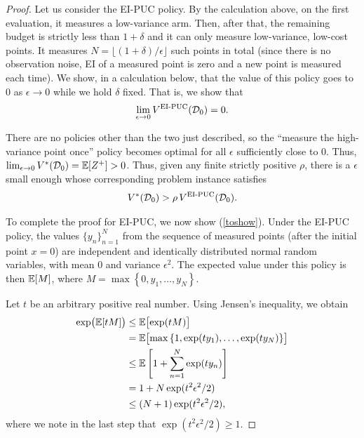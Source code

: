 \begin{proof}
Let us consider the EI-PUC policy. By the calculation above, on the first evaluation, it measures a low-variance arm. Then, after that, the remaining budget is strictly less than $1+\delta$ and it can only measure low-variance, low-cost points. It measures $N = \lfloor (1+\delta)/\epsilon \rfloor$ such points in total (since there is no observation noise, EI of a measured point is zero and a new point is measured each time). We show, in a calculation below, that the value of this policy goes to $0$ as $\epsilon \to 0$ while we hold $\delta$ fixed.
That is, we show that 
\begin{equation}
\lim_{\epsilon \to 0} V^{\mathrm{EI\textnormal{-}PUC}}(\mathcal{D}_0) = 0.
\label{toshow}
\end{equation}

There are no policies other than the two just described, so the ``measure the high-variance point once'' policy becomes optimal for all $\epsilon$ sufficiently close to $0$.
Thus, $\lim_{\epsilon\to0} V^*(\mathcal{D}_0) = \mathbb{E}[Z^+] > 0$. Thus, given any finite strictly positive $\rho$, there is a $\epsilon$ small enough
whose corresponding problem instance satisfies 
\begin{equation*}
V^*(\mathcal{D}_0) > \rho \, V^{\mathrm{EI\textnormal{-}PUC}}(\mathcal{D}_0).
\end{equation*}

To complete the proof for EI-PUC, we now show (\ref{toshow}).
Under the EI-PUC policy, the values $\{y_n\}_{n=1}^N$ from the sequence of measured points (after the initial point $x=0$) are independent and identically distributed normal random variables, with mean 0 and variance $\epsilon^2$. The expected value under this policy is then $\mathbb{E}[M]$, where $M = \max\left\{0, y_1, \ldots, y_N \right\}$. 

Let $t$ be an arbitrary positive real number. Using Jensen's inequality, we obtain
\begin{align*}
\exp \bigl(\mathbb{E}[tM] \bigr) &\leq \mathbb{E}\bigl[\exp(tM)\bigr]\\
&=\mathbb{E}\bigl[\max\left\{1, \exp(ty_1), \dots, \exp(ty_N) \right\}\bigr]\\
&\leq\mathbb{E}\left[1 + \sum_{n=1}^N\exp(ty_n)\right]\\
&=1 + N\exp(t^2\epsilon^2/2)\\
&\leq (N+1)\exp(t^2\epsilon^2/2),
\end{align*}
where we note in the last step that 
$\exp(t^2\epsilon^2/2) \ge 1$.


\end{proof}
